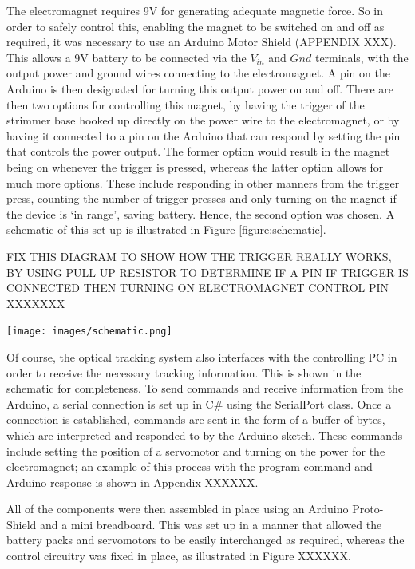 \documentclass[11pt]{article}
\begin{document}
The electromagnet requires 9V for generating adequate magnetic force. So in order to safely control this, enabling the magnet to be switched on and off as required, it was necessary to use an Arduino Motor Shield (APPENDIX XXX). This allows a 9V battery to be connected via the $V_{in}$ and $Gnd$ terminals, with the output power and ground wires connecting to the electromagnet. A pin on the Arduino is then designated for turning this output power on and off. There are then two options for controlling this magnet, by having the trigger of the strimmer base hooked up directly on the power wire to the electromagnet, or by having it connected to a pin on the Arduino that can respond by setting the pin that controls the power output. The former option would result in the magnet being on whenever the trigger is pressed, whereas the latter option allows for much more options. These include responding in other manners from the trigger press, counting the number of trigger presses and only turning on the magnet if the device is `in range', saving battery. Hence, the second option was chosen. A schematic of this set-up is illustrated in Figure \ref{figure:schematic}.


FIX THIS DIAGRAM TO SHOW HOW THE TRIGGER REALLY WORKS, BY USING PULL UP RESISTOR TO DETERMINE IF A PIN IF TRIGGER IS CONNECTED THEN TURNING ON ELECTROMAGNET CONTROL PIN XXXXXXX

\begin{center}
\texttt{[image: images/schematic.png]}
\label{figure:schematic}
\end{center}

Of course, the optical tracking system also interfaces with the controlling PC in order to receive the necessary tracking information. This is shown in the schematic for completeness. To send commands and receive information from the Arduino, a serial connection is set up in C\# using the SerialPort class. Once a connection is established, commands are sent in the form of a buffer of bytes, which are interpreted and responded to by the Arduino sketch. These commands include setting the position of a servomotor and turning on the power for the electromagnet; an example of this process with the program command and Arduino response is shown in Appendix XXXXXX.

All of the components were then assembled in place using an Arduino Proto-Shield and a mini breadboard. This was set up in a manner that allowed the battery packs and servomotors to be easily interchanged as required, whereas the control circuitry was fixed in place, as illustrated in Figure XXXXXX.
\end{document}
